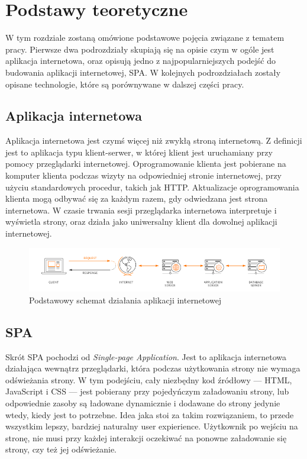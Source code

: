 \chapter{Podstawy teoretyczne} \label{chap:teoria}
W tym rozdziale zostaną omówione podstawowe pojęcia związane z tematem pracy. Pierwsze dwa podrozdziały skupiają się na opisie czym w ogóle jest aplikacja internetowa, oraz opisują jedno z najpopularniejszych podejść do budowania aplikacji internetowej, SPA. W kolejnych podrozdziałach zostały opisane technologie, które są porównywane w dalszej części pracy.
\section{Aplikacja internetowa}
Aplikacja internetowa jest czymś więcej niż zwykłą stroną internetową. Z definicji jest to aplikacja typu klient-serwer, w której klient jest uruchamiany przy pomocy przeglądarki internetowej. Oprogramowanie klienta jest pobierane na komputer klienta podczas wizyty na odpowiedniej stronie internetowej, przy użyciu standardowych procedur, takich jak HTTP. Aktualizacje oprogramowania klienta mogą odbywać się za każdym razem, gdy odwiedzana jest strona internetowa. W czasie trwania sesji przeglądarka internetowa interpretuje i wyświetla strony, oraz działa jako uniwersalny klient dla dowolnej aplikacji internetowej.
\begin{figure}[h]
	\centering
	\includegraphics[width=\textwidth]{images/how_web_application_works}
	\caption{Podstawowy schemat działania aplikacji internetowej \cite{MaxCdnWebApp}}
\end{figure}
\section{SPA}Skrót SPA pochodzi od \textit{Single-page Application}. Jest to aplikacja internetowa działająca wewnątrz przeglądarki, która podczas użytkowania strony nie wymaga odświeżania strony. W tym podejściu, cały niezbędny kod źródłowy --- HTML, JavaScript i CSS --- jest pobierany przy pojedyńczym załadowaniu strony, lub odpowiednie zasoby są ładowane dynamicznie i dodawane do strony jedynie wtedy, kiedy jest to potrzebne. Idea jaka stoi za takim rozwiązaniem, to przede wszystkim lepszy, bardziej naturalny user expierience. Użytkownik po wejściu na stronę, nie musi przy każdej interakcji oczekiwać na ponowne załadowanie się strony, czy też jej odświeżanie.


